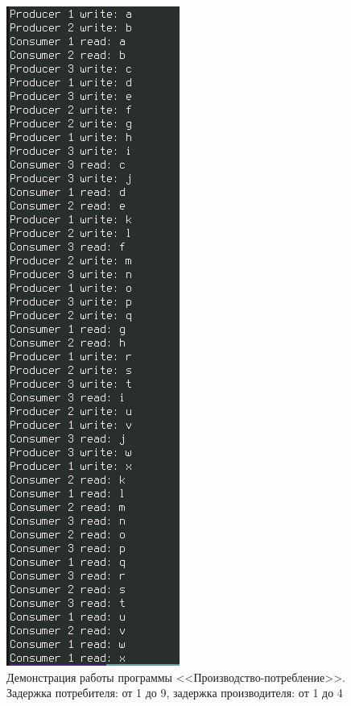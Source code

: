 \documentclass[12pt]{report}
\begin{document}
\begin{figure}[H]
	\centering
	\includegraphics[scale=0.75]{img/prod-cons-02.png}
	\caption{Демонстрация работы программы <<Производство-потребление>>. Задержка потребителя: от 1 до 9, задержка производителя: от 1 до 4}
	\label{fig:task01-02}
\end{figure}
\end{document}
